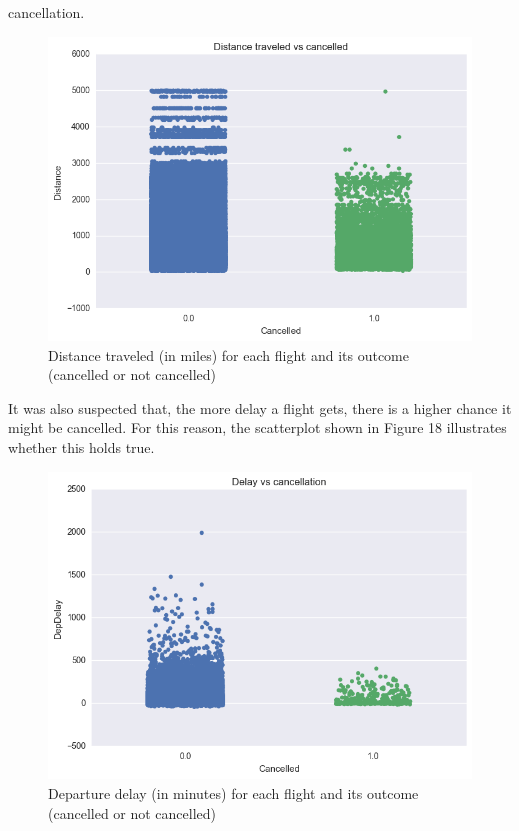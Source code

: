 \documentclass{article}
\begin{document}
    cancellation.
    \begin{figure}[H]
      \includegraphics[width=\linewidth]{graph/ratio_cancelled_distance.png}
      \caption{Distance traveled (in miles) for each flight and its outcome (cancelled or not cancelled)}
      \label{fig:graph1}
    \end{figure}
    \indent It was also suspected that, the more delay a flight gets, there is a higher chance it might
    be cancelled. For this reason, the scatterplot shown in Figure 18 illustrates whether this
    holds true.
    \begin{figure}[H]
      \includegraphics[width=\linewidth]{graph/ratio_cancelled_depdelay.png}
      \caption{Departure delay (in minutes) for each flight and its outcome (cancelled or not cancelled)}
      \label{fig:graph1}
    \end{figure}
\end{document}
